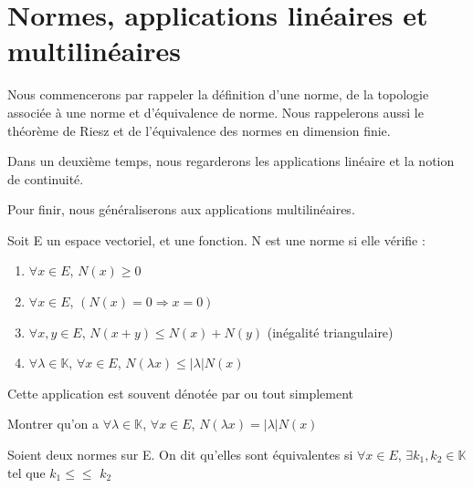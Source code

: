\chapter{Normes, applications linéaires et multilinéaires}


Nous commencerons par rappeler la définition d'une norme, de la topologie
associée à une norme et d'équivalence de norme. Nous rappelerons aussi le
théorème de Riesz et de l'équivalence des normes en dimension finie.

Dans un deuxième temps, nous regarderons les applications linéaire et la notion
de continuité.

Pour finir, nous généraliserons aux applications multilinéaires.

\begin{definition}
    Soit E un espace vectoriel, et  une fonction.
    N est une norme si elle vérifie :
    \begin{enumerate}
        \item $\forall x \in E$, $N(x) \geq 0$
        \item $\forall x \in E$, $(N(x) = 0 \Rightarrow x = 0)$
        \item $\forall x, y \in E$, $N(x + y) \leq N(x) + N(y)$ (inégalité
            triangulaire)
        \item $\forall \lambda \in \mathbb{K}$, $\forall x \in E$, $N(\lambda x)
            \leq |\lambda| N(x)$
    \end{enumerate}
    Cette application est souvent dénotée par  ou tout simplement
\end{definition}

\begin{exercice}
    Montrer qu'on a
    $\forall \lambda \in \mathbb{K}$, $\forall x \in E$, $N(\lambda x) =
    |\lambda| N(x)$
\end{exercice}

\begin{definition}
    Soient deux normes   sur E. On dit qu'elles
    sont équivalentes si $\forall x \in E$, $\exists k_{1}, k_{2} \in
    \mathbb{K}$ tel que $k_{1}$$\leq$$\leq$
    $k_{2}$
\end{definition}

